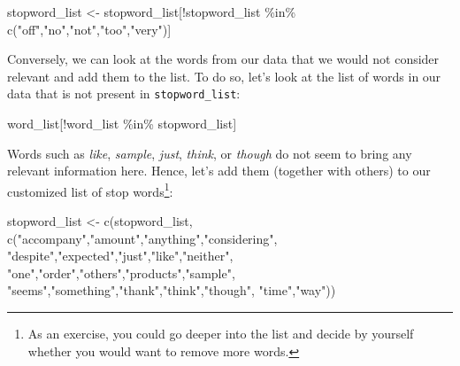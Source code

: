 \documentclass[
]{krantz}
\makeatletter
\newenvironment{Shaded}{\begin{snugshade}}{\end{snugshade}}
\newcommand{\FunctionTok}[1]{\textcolor[rgb]{0,0,0}{#1}}
\newcommand{\NormalTok}[1]{#1}
\newcommand{\OtherTok}[1]{\textcolor[rgb]{0.37,0.37,0.37}{#1}}
\newcommand{\SpecialCharTok}[1]{\textcolor[rgb]{0,0,0}{#1}}
\newcommand{\StringTok}[1]{\textcolor[rgb]{0.5,0.5,0.5}{#1}}
\newenvironment{kframe}{%
\medskip{}
\setlength{\fboxsep}{.8em}
 \def\at@end@of@kframe{}%
 \ifinner\ifhmode%
  \def\at@end@of@kframe{\end{minipage}}%
  \begin{minipage}{\columnwidth}%
 \fi\fi%
 \def\FrameCommand##1{\hskip\@totalleftmargin \hskip-\fboxsep
 \colorbox{shadecolor}{##1}\hskip-\fboxsep
     \hskip-\linewidth \hskip-\@totalleftmargin \hskip\columnwidth}%
 \MakeFramed {\advance\hsize-\width
   \@totalleftmargin\z@ \linewidth\hsize
   \@setminipage}}%
 {\par\unskip\endMakeFramed%
 \at@end@of@kframe}
\renewenvironment{Shaded}{\begin{kframe}}{\end{kframe}}
\makeatother
\begin{document}
\begin{Shaded}
\begin{Highlighting}[]
\NormalTok{stopword\_list }\OtherTok{\textless{}{-}}\NormalTok{ stopword\_list[}\SpecialCharTok{!}\NormalTok{stopword\_list }\SpecialCharTok{\%in\%} 
                                 \FunctionTok{c}\NormalTok{(}\StringTok{"off"}\NormalTok{,}\StringTok{"no"}\NormalTok{,}\StringTok{"not"}\NormalTok{,}\StringTok{"too"}\NormalTok{,}\StringTok{"very"}\NormalTok{)]}
\end{Highlighting}
\end{Shaded}

Conversely, we can look at the words from our data that we would not consider relevant and add them to the list. To do so, let's look at the list of words in our data that is not present in \texttt{stopword\_list}:

\begin{Shaded}
\begin{Highlighting}[]
\NormalTok{word\_list[}\SpecialCharTok{!}\NormalTok{word\_list }\SpecialCharTok{\%in\%}\NormalTok{ stopword\_list]}
\end{Highlighting}
\end{Shaded}

Words such as \emph{like}, \emph{sample}, \emph{just}, \emph{think}, or \emph{though} do not seem to bring any relevant information here. Hence, let's add them (together with others) to our customized list of stop words\footnote{As an exercise, you could go deeper into the list and decide by yourself whether you would want to remove more words.}:

\begin{Shaded}
\begin{Highlighting}[]
\NormalTok{stopword\_list }\OtherTok{\textless{}{-}} \FunctionTok{c}\NormalTok{(stopword\_list, }
                   \FunctionTok{c}\NormalTok{(}\StringTok{"accompany"}\NormalTok{,}\StringTok{"amount"}\NormalTok{,}\StringTok{"anything"}\NormalTok{,}\StringTok{"considering"}\NormalTok{,}
                     \StringTok{"despite"}\NormalTok{,}\StringTok{"expected"}\NormalTok{,}\StringTok{"just"}\NormalTok{,}\StringTok{"like"}\NormalTok{,}\StringTok{"neither"}\NormalTok{,}
                     \StringTok{"one"}\NormalTok{,}\StringTok{"order"}\NormalTok{,}\StringTok{"others"}\NormalTok{,}\StringTok{"products"}\NormalTok{,}\StringTok{"sample"}\NormalTok{,}
                     \StringTok{"seems"}\NormalTok{,}\StringTok{"something"}\NormalTok{,}\StringTok{"thank"}\NormalTok{,}\StringTok{"think"}\NormalTok{,}\StringTok{"though"}\NormalTok{,}
                     \StringTok{"time"}\NormalTok{,}\StringTok{"way"}\NormalTok{))}
\end{Highlighting}
\end{Shaded}
\end{document}
